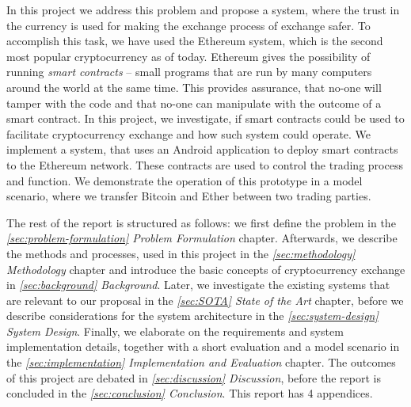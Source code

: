 In this project we address this problem and propose a system, where the trust in the currency is used for making the exchange process of exchange safer. To accomplish this task, we have used the Ethereum system, which is the second most popular cryptocurrency as of today. Ethereum gives the possibility of running \emph{smart contracts} -- small programs that are run by many computers around the world at the same time. This provides assurance, that no-one will tamper with the code and that no-one can manipulate with the outcome of a smart contract. 
% 
% 
In this project, we investigate, if smart contracts could be used to facilitate cryptocurrency exchange and how such system could operate. We implement a system, that uses an Android application to deploy smart contracts to the Ethereum network. These contracts are used to control the trading process and function. We demonstrate the operation of this prototype in a model scenario, where we transfer Bitcoin and Ether between two trading parties.

The rest of the report is structured as follows: we first define the problem in the \textit{\ref{sec:problem-formulation} Problem Formulation} chapter. Afterwards, we describe the methods and processes, used in this project in the \textit{\ref{sec:methodology} Methodology} chapter and introduce the basic concepts of cryptocurrency exchange in \textit{\ref{sec:background} Background}. Later, we investigate the existing systems that are relevant to our proposal in the \textit{\ref{sec:SOTA} State of the Art} chapter, before we describe considerations for the system architecture in the \textit{\ref{sec:system-design} System Design}. Finally, we elaborate on the requirements and system implementation details, together with a short evaluation and a model scenario in the \textit{\ref{sec:implementation} Implementation and Evaluation} chapter. The outcomes of this project are debated in \textit{\ref{sec:discussion} Discussion}, before the report is concluded in the \textit{\ref{sec:conclusion} Conclusion}. This report has 4 appendices.